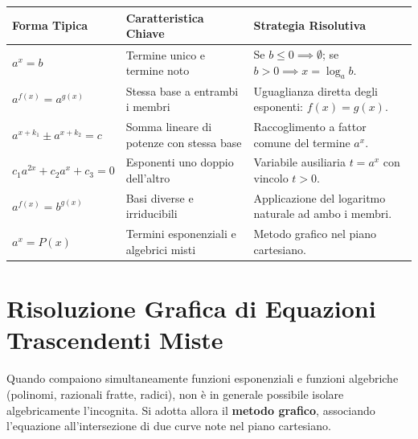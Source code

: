 \documentclass[11pt,a4paper,oneside]{report}
\begin{document}
\begin{metodo}
\small
\begin{tabularx}{\textwidth}{l p{5cm} X}
\toprule
\textbf{Forma Tipica} & \textbf{Caratteristica Chiave} & \textbf{Strategia Risolutiva} \\
\midrule
$a^x = b$ & Termine unico e termine noto & Se $b \le 0 \implies \emptyset$; se $b > 0 \implies x = \log_a b$. \\
$a^{f(x)} = a^{g(x)}$ & Stessa base a entrambi i membri & Uguaglianza diretta degli esponenti: $f(x) = g(x)$. \\
$a^{x+k_1} \pm a^{x+k_2} = c$ & Somma lineare di potenze con stessa base & Raccoglimento a fattor comune del termine $a^x$. \\
$c_1 a^{2x} + c_2 a^x + c_3 = 0$ & Esponenti uno doppio dell'altro & Variabile ausiliaria $t = a^x$ con vincolo $t > 0$. \\
$a^{f(x)} = b^{g(x)}$ & Basi diverse e irriducibili & Applicazione del logaritmo naturale ad ambo i membri. \\
$a^x = P(x)$ & Termini esponenziali e algebrici misti & Metodo grafico nel piano cartesiano. \\
\bottomrule
\end{tabularx}
\end{metodo}

\section{Risoluzione Grafica di Equazioni Trascendenti Miste}
Quando compaiono simultaneamente funzioni esponenziali e funzioni algebriche (polinomi, razionali fratte, radici), non è in generale possibile isolare algebricamente l'incognita. Si adotta allora il \textbf{metodo grafico}, associando l'equazione all'intersezione di due curve note nel piano cartesiano.
\end{document}
